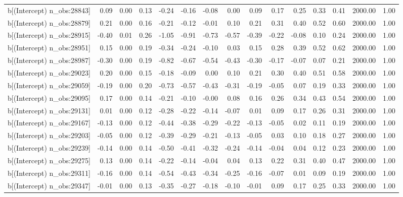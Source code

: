 \begin{table}[ht]
\begin{tabular}{rrrrrrrrrrrrrrr}
  b[(Intercept) n\_obs:28843] & 0.09 & 0.00 & 0.13 & -0.24 & -0.16 & -0.08 & 0.00 & 0.09 & 0.17 & 0.25 & 0.33 & 0.41 & 2000.00 & 1.00 \\ 
  b[(Intercept) n\_obs:28879] & 0.21 & 0.00 & 0.16 & -0.21 & -0.12 & -0.01 & 0.10 & 0.21 & 0.31 & 0.40 & 0.52 & 0.60 & 2000.00 & 1.00 \\ 
  b[(Intercept) n\_obs:28915] & -0.40 & 0.01 & 0.26 & -1.05 & -0.91 & -0.73 & -0.57 & -0.39 & -0.22 & -0.08 & 0.10 & 0.24 & 2000.00 & 1.00 \\ 
  b[(Intercept) n\_obs:28951] & 0.15 & 0.00 & 0.19 & -0.34 & -0.24 & -0.10 & 0.03 & 0.15 & 0.28 & 0.39 & 0.52 & 0.62 & 2000.00 & 1.00 \\ 
  b[(Intercept) n\_obs:28987] & -0.30 & 0.00 & 0.19 & -0.82 & -0.67 & -0.54 & -0.43 & -0.30 & -0.17 & -0.07 & 0.07 & 0.21 & 2000.00 & 1.00 \\ 
  b[(Intercept) n\_obs:29023] & 0.20 & 0.00 & 0.15 & -0.18 & -0.09 & 0.00 & 0.10 & 0.21 & 0.30 & 0.40 & 0.51 & 0.58 & 2000.00 & 1.00 \\ 
  b[(Intercept) n\_obs:29059] & -0.19 & 0.00 & 0.20 & -0.73 & -0.57 & -0.43 & -0.31 & -0.19 & -0.05 & 0.07 & 0.19 & 0.33 & 2000.00 & 1.00 \\ 
  b[(Intercept) n\_obs:29095] & 0.17 & 0.00 & 0.14 & -0.21 & -0.10 & -0.00 & 0.08 & 0.16 & 0.26 & 0.34 & 0.43 & 0.54 & 2000.00 & 1.00 \\ 
  b[(Intercept) n\_obs:29131] & 0.01 & 0.00 & 0.12 & -0.28 & -0.22 & -0.14 & -0.07 & 0.01 & 0.09 & 0.17 & 0.26 & 0.31 & 2000.00 & 1.00 \\ 
  b[(Intercept) n\_obs:29167] & -0.13 & 0.00 & 0.12 & -0.44 & -0.38 & -0.29 & -0.22 & -0.13 & -0.05 & 0.02 & 0.11 & 0.19 & 2000.00 & 1.00 \\ 
  b[(Intercept) n\_obs:29203] & -0.05 & 0.00 & 0.12 & -0.39 & -0.29 & -0.21 & -0.13 & -0.05 & 0.03 & 0.10 & 0.18 & 0.27 & 2000.00 & 1.00 \\ 
  b[(Intercept) n\_obs:29239] & -0.14 & 0.00 & 0.14 & -0.50 & -0.41 & -0.32 & -0.24 & -0.14 & -0.04 & 0.04 & 0.12 & 0.23 & 2000.00 & 1.00 \\ 
  b[(Intercept) n\_obs:29275] & 0.13 & 0.00 & 0.14 & -0.22 & -0.14 & -0.04 & 0.04 & 0.13 & 0.22 & 0.31 & 0.40 & 0.47 & 2000.00 & 1.00 \\ 
  b[(Intercept) n\_obs:29311] & -0.16 & 0.00 & 0.14 & -0.54 & -0.43 & -0.34 & -0.25 & -0.16 & -0.07 & 0.01 & 0.09 & 0.19 & 2000.00 & 1.00 \\ 
  b[(Intercept) n\_obs:29347] & -0.01 & 0.00 & 0.13 & -0.35 & -0.27 & -0.18 & -0.10 & -0.01 & 0.09 & 0.17 & 0.25 & 0.33 & 2000.00 & 1.00 \\ 

\end{tabular}
\end{table}
